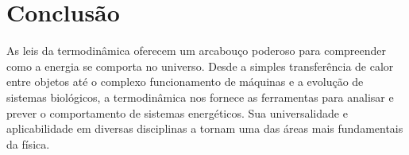 \documentclass{article}
\begin{document}
\section{Conclusão}

As leis da termodinâmica oferecem um arcabouço poderoso para compreender como a energia se comporta no universo. Desde a simples transferência de calor entre objetos até o complexo funcionamento de máquinas e a evolução de sistemas biológicos, a termodinâmica nos fornece as ferramentas para analisar e prever o comportamento de sistemas energéticos. Sua universalidade e aplicabilidade em diversas disciplinas a tornam uma das áreas mais fundamentais da física.
\end{document}
